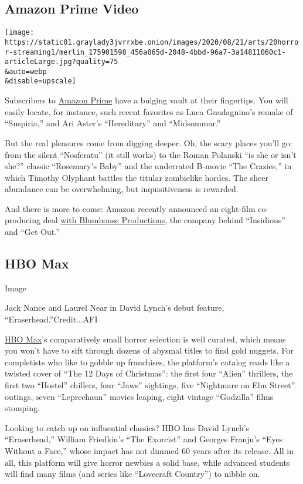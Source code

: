 \hypertarget{amazon-prime-video}{%
\subsection{Amazon Prime Video}\label{amazon-prime-video}}

\texttt{[image: https://static01.graylady3jvrrxbe.onion/images/2020/08/21/arts/20horror-streaming1/merlin\_175901598\_456a065d-2048-4bbd-96a7-3a14811060c1-articleLarge.jpg?quality=75\\\&auto=webp\\\&disable=upscale]}

Subscribers to \href{https://www.amazon.com/amazonprime}{Amazon Prime}
have a bulging vault at their fingertips. You will easily locate, for
instance, such recent favorites as Luca Guadagnino's remake of
``Suspiria,'' and Ari Aster's ``Hereditary'' and ``Midsommar.''

But the real pleasures come from digging deeper. Oh, the scary places
you'll go: from the silent ``Nosferatu'' (it still works) to the Roman
Polanski ``is she or isn't she?'' classic ``Rosemary's Baby'' and the
underrated B-movie ``The Crazies,'' in which Timothy Olyphant battles
the titular zombielike hordes. The sheer abundance can be overwhelming,
but inquisitiveness is rewarded.

And there is more to come: Amazon recently announced an eight-film
co-producing deal
\href{https://www.instagram.com/welcometotheblumhouse/}{with Blumhouse
Productions}, the company behind ``Insidious'' and ``Get Out.''

\hypertarget{hbo-max}{%
\subsection{HBO Max}\label{hbo-max}}

Image

Jack Nance and Laurel Near in David Lynch's debut feature,
``Eraserhead.''Credit...AFI

\href{https://www.hbomax.com/}{HBO Max}'s comparatively small horror
selection is well curated, which means you won't have to sift through
dozens of abysmal titles to find gold nuggets. For completists who like
to gobble up franchises, the platform's catalog reads like a twisted
cover of ``The 12 Days of Christmas'': the first four ``Alien''
thrillers, the first two ``Hostel'' chillers, four ``Jaws'' sightings,
five ``Nightmare on Elm Street'' outings, seven ``Leprechaun'' movies
leaping, eight vintage ``Godzilla'' films stomping.

Looking to catch up on influential classics? HBO has David Lynch's
``Eraserhead,'' William Friedkin's ``The Exorcist'' and Georges Franju's
``Eyes Without a Face,'' whose impact has not dimmed 60 years after its
release. All in all, this platform will give horror newbies a solid
base, while advanced students will find many films (and series like
``Lovecraft Country'') to nibble on.

